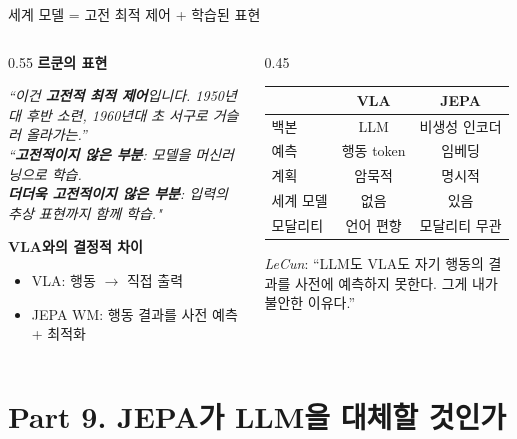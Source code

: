 \documentclass[aspectratio=169,10pt]{beamer}
\begin{document}
\begin{frame}{세계 모델 = 고전 최적 제어 + 학습된 표현}
\begin{columns}[T]
\begin{column}{0.55\textwidth}
\textbf{르쿤의 표현}
\begin{block}{}
\textit{``이건 \textbf{고전적 최적 제어}입니다. 1950년대 후반 소련, 1960년대 초 서구로 거슬러 올라가는.''\\[0.3em]
``\textbf{고전적이지 않은 부분}: 모델을 머신러닝으로 학습.\\
\textbf{더더욱 고전적이지 않은 부분}: 입력의 추상 표현까지 \alert{함께} 학습."}
\end{block}

\vspace{0.4em}
\textbf{VLA와의 결정적 차이}
\begin{itemize}
  \item VLA: 행동 $\to$ 직접 출력
  \item JEPA WM: 행동 결과를 \alert{사전 예측} + 최적화
\end{itemize}
\end{column}
\begin{column}{0.45\textwidth}
\begin{tabular}{lcc}
\toprule
 & VLA & JEPA \\
\midrule
백본 & LLM & 비생성 인코더 \\
예측 & 행동 token & 임베딩 \\
계획 & 암묵적 & \alert{명시적} \\
세계 모델 & 없음 & \alert{있음} \\
모달리티 & 언어 편향 & 모달리티 무관 \\
\bottomrule
\end{tabular}

\vspace{0.6em}
\footnotesize
\textit{LeCun}: ``LLM도 VLA도 자기 행동의 결과를 사전에 예측하지 못한다. 그게 내가 불안한 이유다.''
\end{column}
\end{columns}
\end{frame}

\section{Part 9. JEPA가 LLM을 대체할 것인가}
\end{document}
